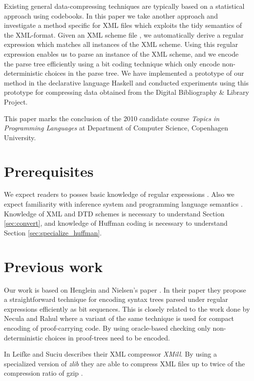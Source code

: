 \documentclass[a4paper, oneside]{memoir}
\theoremstyle{definition}
\begin{document}
Existing general data-compressing techniques are typically based on a
statistical approach using codebooks. In this paper we take another approach and
investigate a method specific for XML files which exploits the tidy semantics of
the XML-format. Given an XML scheme file \cite{wa2001}, we automatically derive
a regular expression which matches all instances of the XML scheme. Using this
regular expression enables us to parse an instance of the XML scheme, and we
encode the parse tree efficiently using a bit coding technique which only encode
non-deterministic choices in the parse tree. We have implemented a prototype of
our method in the declarative language Haskell \cite{sugost2008} and conducted
experiments using this prototype for compressing data obtained from the Digital
Bibliography \& Library Project.

This paper marks the conclusion of the 2010 candidate course \emph{Topics in
  Programming Languages} at Department of Computer Science, Copenhagen
University.

\section{Prerequisites}

We expect readers to posses basic knowledge of regular expressions \cite{houl2006}.
Also we expect familiarity with inference system and programming language semantics \cite{gu1992, wi1993}.
Knowledge of XML and DTD schemes is necessary to understand Section \ref{sec:convert},
and knowledge of Huffman coding \cite[Section 16.3]{co2001} is necessary to understand Section \ref{sec:specialize_huffman}.

\section{Previous work}

Our work is based on Henglein and Nielsen's paper \cite{heni2010}. In their
paper they propose a straightforward technique for encoding syntax trees parsed
under regular expressions efficiently as bit sequences. This is closely related
to the work done by Necula and Rahul \cite{nera2001} where a variant of the same
technique is used for compact encoding of proof-carrying code. By using
oracle-based checking only non-deterministic choices in proof-trees need to be
encoded.

In \cite{lisu2000} Leifke and Suciu describes their XML compressor
\emph{XMill}. By using a specialized version of \emph{zlib} \cite{dega1996} they
are able to compress XML files up to twice of the compression ratio of gzip
\cite{de1996}.
\end{document}

